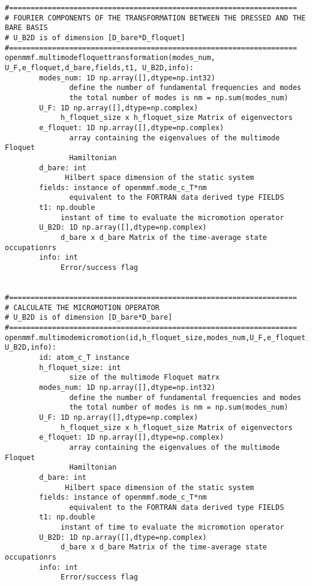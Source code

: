\documentclass[10pt,a4paper]{article}
\begin{document}
\begin{verbatim}
#===================================================================
# FOURIER COMPONENTS OF THE TRANSFORMATION BETWEEN THE DRESSED AND THE BARE BASIS
# U_B2D is of dimension [D_bare*D_floquet]
#===================================================================
openmmf.multimodefloquettransformation(modes_num, U_F,e_floquet,d_bare,fields,t1, U_B2D,info): 
        modes_num: 1D np.array([],dtype=np.int32)
               define the number of fundamental frequencies and modes
               the total number of modes is nm = np.sum(modes_num)
        U_F: 1D np.array([],dtype=np.complex)
             h_floquet_size x h_floquet_size Matrix of eigenvectors            
        e_floquet: 1D np.array([],dtype=np.complex)
               array containing the eigenvalues of the multimode Floquet
               Hamiltonian
        d_bare: int
              Hilbert space dimension of the static system
        fields: instance of openmmf.mode_c_T*nm 
               equivalent to the FORTRAN data derived type FIELDS
        t1: np.double
             instant of time to evaluate the micromotion operator
        U_B2D: 1D np.array([],dtype=np.complex)
             d_bare x d_bare Matrix of the time-average state occupationrs                          
        info: int
             Error/success flag


#===================================================================
# CALCULATE THE MICROMOTION OPERATOR
# U_B2D is of dimension [D_bare*D_bare]
#===================================================================
openmmf.multimodemicromotion(id,h_floquet_size,modes_num,U_F,e_floquet,d_bare,fields,t1, U_B2D,info):
        id: atom_c_T instance
        h_floquet_size: int
               size of the multimode Floquet matrx
        modes_num: 1D np.array([],dtype=np.int32)
               define the number of fundamental frequencies and modes
               the total number of modes is nm = np.sum(modes_num)
        U_F: 1D np.array([],dtype=np.complex)
             h_floquet_size x h_floquet_size Matrix of eigenvectors            
        e_floquet: 1D np.array([],dtype=np.complex)
               array containing the eigenvalues of the multimode Floquet
               Hamiltonian
        d_bare: int
              Hilbert space dimension of the static system
        fields: instance of openmmf.mode_c_T*nm 
               equivalent to the FORTRAN data derived type FIELDS
        t1: np.double
             instant of time to evaluate the micromotion operator
        U_B2D: 1D np.array([],dtype=np.complex)
             d_bare x d_bare Matrix of the time-average state occupationrs                          
        info: int
             Error/success flag


\end{verbatim}
\end{document}
